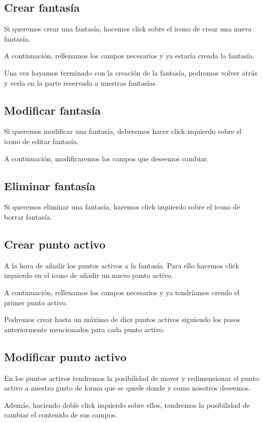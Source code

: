 \subsection{Crear fantasía}
Si queremos crear una fantasía, hacemos click sobre el icono de crear una nueva fantasía.

A continuación, rellenamos los campos necesarios y ya estaría creada la fantasía.

Una vez hayamos terminado con la creación de la fantasía, podremos volver atrás y verla en la parte reservada a nuestras fantasías.

\subsection{Modificar fantasía}
Si queremos modificar una fantasía, deberemos hacer click izquierdo sobre el icono de editar fantasía.

A continuación, modificaremos los campos que deseemos cambiar.

\subsection{Eliminar fantasía}
Si queremos eliminar una fantasía, haremos click izquierdo sobre el icono de borrar fantasía.

\subsection{Crear punto activo}
A la hora de añadir los puntos activos a la fantasía. Para ello hacemos click izquierdo en el icono de añadir un nuevo punto activo.

A continuación, rellenamos los campos necesarios y ya tendríamos creado el primer punto activo.

Podremos crear hasta un máximo de diez puntos activos siguiendo los pasos anteriormente mencionados para cada punto activo.


\subsection{Modificar punto activo}
En los puntos activos tendremos la posibilidad de mover y redimensionar el punto activo a nuestro gusto de forma que se quede donde y como nosotros deseemos.

Además, haciendo doble click izquierdo sobre ellos, tendremos la posibilidad de cambiar el contenido de sus campos.

